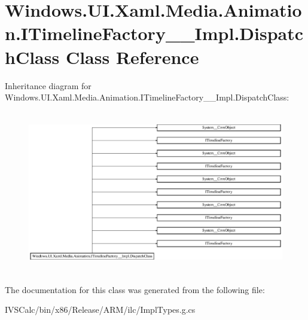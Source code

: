 \hypertarget{class_windows_1_1_u_i_1_1_xaml_1_1_media_1_1_animation_1_1_i_timeline_factory_____impl_1_1_dispatch_class}{}\section{Windows.\+U\+I.\+Xaml.\+Media.\+Animation.\+I\+Timeline\+Factory\+\_\+\+\_\+\+Impl.\+Dispatch\+Class Class Reference}
\label{class_windows_1_1_u_i_1_1_xaml_1_1_media_1_1_animation_1_1_i_timeline_factory_____impl_1_1_dispatch_class}
Inheritance diagram for Windows.\+U\+I.\+Xaml.\+Media.\+Animation.\+I\+Timeline\+Factory\+\_\+\+\_\+\+Impl.\+Dispatch\+Class\+:\begin{figure}[H]
\begin{center}
\leavevmode
\includegraphics[height=7.129629cm]{class_windows_1_1_u_i_1_1_xaml_1_1_media_1_1_animation_1_1_i_timeline_factory_____impl_1_1_dispatch_class}
\end{center}
\end{figure}


The documentation for this class was generated from the following file\+:\begin{DoxyCompactItemize}
\item 
I\+V\+S\+Calc/bin/x86/\+Release/\+A\+R\+M/ilc/Impl\+Types.\+g.\+cs\end{DoxyCompactItemize}
